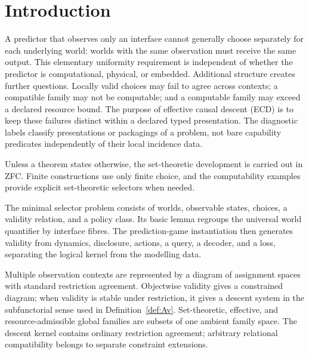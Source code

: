 \documentclass[11pt]{article}
\theoremstyle{plain}
\theoremstyle{definition}
\theoremstyle{remark}
\begin{document}
\tableofcontents

\section{Introduction}\label{sec:intro}

A predictor that observes only an interface cannot generally choose separately
for each underlying world: worlds with the same observation must receive the
same output. This elementary uniformity requirement is independent of whether
the predictor is computational, physical, or embedded. Additional structure
creates further questions. Locally valid choices may fail to agree across
contexts; a compatible family may not be computable; and a computable family may
exceed a declared resource bound. The purpose of effective causal descent (ECD)
is to keep these failures distinct within a declared typed presentation. The
diagnostic labels classify presentations or packagings of a problem,
not bare capability predicates independently of their local incidence data.

Unless a theorem states otherwise, the set-theoretic development is carried out
in ZFC. Finite constructions use only finite choice, and the computability
examples provide explicit set-theoretic selectors when needed.

The minimal selector problem consists of worlds, observable states, choices, a
validity relation, and a policy class. Its basic lemma regroups the universal
world quantifier by interface fibres. The prediction-game instantiation then
generates validity from dynamics, disclosure, actions, a query, a decoder, and a
loss, separating the logical kernel from the modelling data.

Multiple observation contexts are represented by a diagram of assignment spaces
with standard restriction agreement. Objectwise validity gives a constrained
diagram; when validity is stable under restriction, it gives a descent system in
the subfunctorial sense used in Definition~\ref{def:Av}. Set-theoretic, effective, and resource-admissible
global families are subsets of one ambient family space. The descent kernel contains ordinary restriction agreement; arbitrary relational
compatibility belongs to separate constraint extensions.
\end{document}
